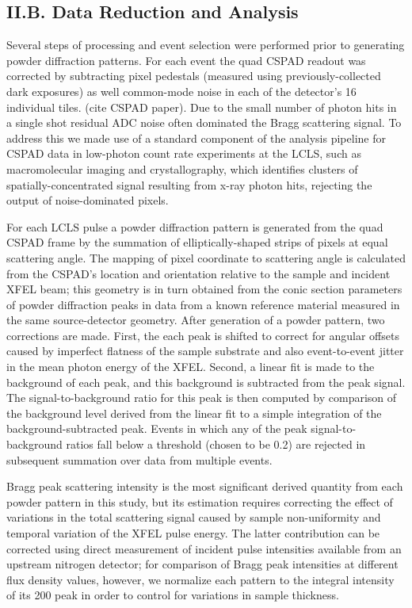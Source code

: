 \subsection{II.B. Data Reduction and Analysis}

Several steps of processing and event selection were performed prior to
generating powder diffraction patterns. For each event the quad CSPAD
readout was corrected by subtracting pixel pedestals (measured using
previously-collected dark exposures) as well common-mode noise in each
of the detector's 16 individual tiles. (cite CSPAD paper). Due to the
small number of photon hits in a single shot residual ADC noise often
dominated the Bragg scattering signal. To address this we made use of a
standard component of the analysis pipeline for CSPAD data in low-photon
count rate experiments at the LCLS, such as macromolecular imaging and
crystallography, which identifies clusters of spatially-concentrated
signal resulting from x-ray photon hits, rejecting the output of
noise-dominated pixels.

For each LCLS pulse a powder diffraction pattern is generated from the
quad CSPAD frame by the summation of elliptically-shaped strips of
pixels at equal scattering angle. The mapping of pixel coordinate to
scattering angle is calculated from the CSPAD's location and orientation
relative to the sample and incident XFEL beam; this geometry is in turn
obtained from the conic section parameters of powder diffraction peaks
in data from a known reference material measured in the same
source-detector geometry. After generation of a powder pattern, two
corrections are made. First, the each peak is shifted to correct for
angular offsets caused by imperfect flatness of the sample substrate and
also event-to-event jitter in the mean photon energy of the XFEL.
Second, a linear fit is made to the background of each peak, and this
background is subtracted from the peak signal. The signal-to-background
ratio for this peak is then computed by comparison of the background
level derived from the linear fit to a simple integration of the
background-subtracted peak. Events in which any of the peak
signal-to-background ratios fall below a threshold (chosen to be 0.2)
are rejected in subsequent summation over data from multiple events.

Bragg peak scattering intensity is the most significant derived quantity
from each powder pattern in this study, but its estimation requires
correcting the effect of variations in the total scattering signal
caused by sample non-uniformity and temporal variation of the XFEL pulse
energy. The latter contribution can be corrected using direct
measurement of incident pulse intensities available from an upstream
nitrogen detector; for comparison of Bragg peak intensities at different
flux density values, however, we normalize each pattern to the integral
intensity of its 200 peak in order to control for variations in sample
thickness.

